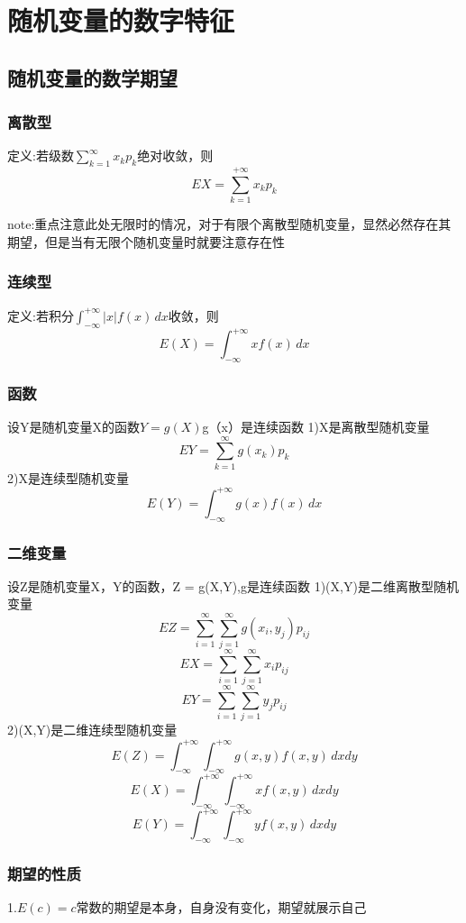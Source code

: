 \documentclass[11pt,twoside,a4paper]{ctexart}
\begin{document}
    \section{随机变量的数字特征}
    \subsection{随机变量的数学期望}
    \subsubsection{离散型}
    定义:若级数$\sum _{k=1}^{\infty}x_kp_k$绝对收敛，则
    \[EX = \sum _{k=1}^{+\infty}x_kp_k\]

    note:重点注意此处无限时的情况，对于有限个离散型随机变量，显然必然存在其期望，但是当有无限个随机变量时就要注意存在性

    \subsubsection{连续型}
    定义:若积分$\int_{-\infty}^{+\infty}|x|f(x)  \,dx $收敛，则
    \[E(X) = \int_{-\infty}^{+\infty}xf(x)  \,dx \]

    \subsubsection{函数}
    设Y是随机变量X的函数$Y = g(X)$g（x）是连续函数
    1)X是离散型随机变量
    \[EY = \sum _{k=1}^{\infty}g(x_k)p_k\]
    2)X是连续型随机变量
    \[E(Y) = \int_{-\infty}^{+\infty}g(x)f(x)  \,dx \]

    \subsubsection{二维变量}
    设Z是随机变量X，Y的函数，Z = g(X,Y),g是连续函数
    1)(X,Y)是二维离散型随机变量
    \[EZ =\sum _{i=1}^{\infty}\sum _{j=1}^{\infty}g(x_i,y_j)p_{ij}\]
    \[EX =\sum _{i=1}^{\infty}\sum _{j=1}^{\infty}x_ip_{ij}\]
    \[EY =\sum _{i=1}^{\infty}\sum _{j=1}^{\infty}y_jp_{ij}\]
    2)(X,Y)是二维连续型随机变量
    \[E(Z) =\int_{-\infty}^{+\infty}\int_{-\infty}^{+\infty}g(x,y)f(x,y) \,dxdy\]
    \[E(X) =\int_{-\infty}^{+\infty}\int_{-\infty}^{+\infty}xf(x,y) \,dxdy \]
    \[E(Y) =\int_{-\infty}^{+\infty}\int_{-\infty}^{+\infty}yf(x,y) \,dxdy\]

    \subsubsection{期望的性质}
    1.$E(c) = c$常数的期望是本身，自身没有变化，期望就展示自己
\end{document}
